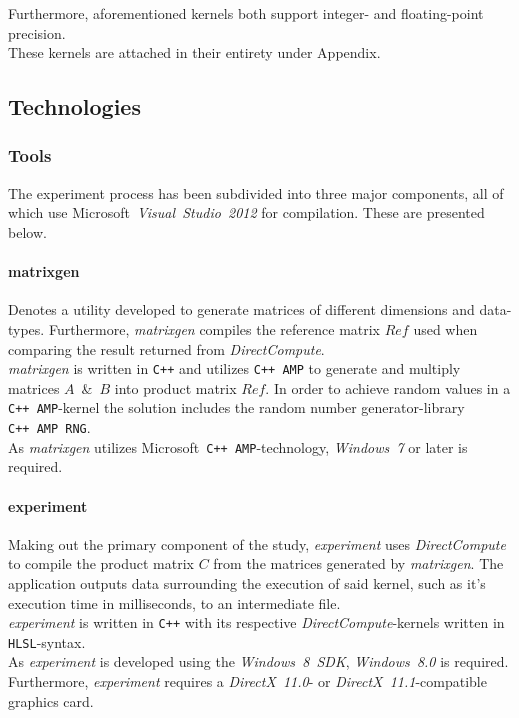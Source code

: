 \documentclass[fleqn,10pt]{SelfArx} %
\begin{document}
\noindent
Furthermore, aforementioned kernels both support integer- and floating-point precision.\\
These kernels are attached in their entirety under Appendix.

\subsection{Technologies}
\label{sec:contribution:technologies}
\subsubsection{Tools}
\label{sec:contribution:technologies}
The experiment process has been subdivided into three major components, all of which use Microsoft~\textit{Visual~Studio~2012} for compilation. These are presented below.

\paragraph{matrixgen}
Denotes a utility developed to generate matrices of different dimensions and data-types. Furthermore, \textit{matrixgen} compiles the reference matrix $Ref$ used when comparing the result returned from \textit{DirectCompute}. \\
\textit{matrixgen} is written in \texttt{C++} and utilizes \texttt{C++~AMP} to generate and multiply matrices $A$~\&~$B$ into product matrix $Ref$. In order to achieve random values in a \texttt{C++~AMP}-kernel the solution includes the random number generator-library \texttt{C++~AMP~RNG}.\\
As \textit{matrixgen} utilizes Microsoft~\texttt{C++~AMP}-technology, \textit{Windows~7} or later is required.

\paragraph{experiment}
Making out the primary component of the study, \textit{experiment} uses \textit{DirectCompute} to compile the product matrix $C$ from the matrices generated by \textit{matrixgen}. The application outputs data surrounding the execution of said kernel, such as it's execution time in milliseconds, to an intermediate file.\\
\textit{experiment} is written in \texttt{C++} with its respective \textit{DirectCompute}-kernels written in \texttt{HLSL}-syntax.\\
As \textit{experiment} is developed using the \textit{Windows~8~SDK}, \textit{Windows~8.0} is required. Furthermore, \textit{experiment} requires a \textit{DirectX~11.0}- or \textit{DirectX~11.1}-compatible graphics card.
\end{document}
